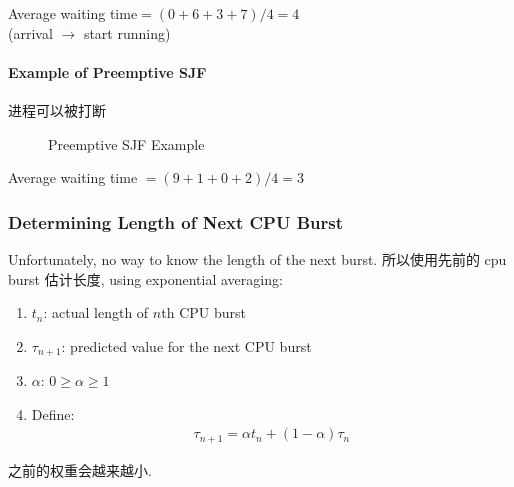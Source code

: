 Average waiting time$= (0 + 6 + 3 + 7)/4 = 4$\\
(arrival $\to$ start running) 

\paragraph{Example of Preemptive SJF}进程可以被打断
\begin{figure}[!htb]
    \centering
    \caption{Preemptive SJF Example}
\end{figure}


Average waiting time $= (9 + 1 + 0 +2)/4 = 3$

\subsubsection{Determining Length of Next CPU Burst}
Unfortunately, no way to know the length of the next burst. 所以使用先前的 cpu burst 估计长度, using exponential averaging:
\begin{enumerate}
    \item $t_n$: actual length of $n$th CPU burst
    \item $\tau_{n+1}$: predicted value for the next CPU burst
    \item $\alpha$: $0\ge \alpha\ge 1$
    \item Define:
    \begin{align*}
        \tau_{n+1}=\alpha t_n+(1-\alpha)\tau_n
    \end{align*}
\end{enumerate}
之前的权重会越来越小. 

